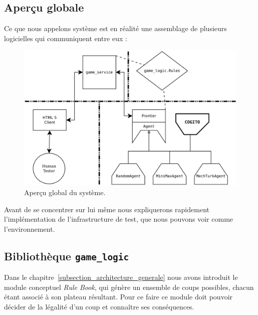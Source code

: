\subsection{Aperçu globale}

Ce que nous appelons système est en réalité une assemblage de plusieurs logicielles qui communiquent entre eux :

\begin{figure}[H] 
\centering
\includegraphics[width=\textwidth]{files/william/archi_full} 
\caption{Aperçu global du système.} 
\end{figure}

Avant de se concentrer sur \cogito{} lui même nous expliquerons rapidement l'implémentation de l'infrastructure de test, que nous pouvons voir comme l'environnement.

\subsection{Bibliothèque \texttt{\gls{game_logic}}}

Dans le chapitre~\ref{subsection_architecture_generale} nous avons introduit le module conceptuel \emph{Rule Book}, qui génère un ensemble de coups possibles, chacun étant associé à son plateau résultant. Pour ce faire ce module doit pouvoir décider de la légalité d'un coup et connaître ses conséquences. 

